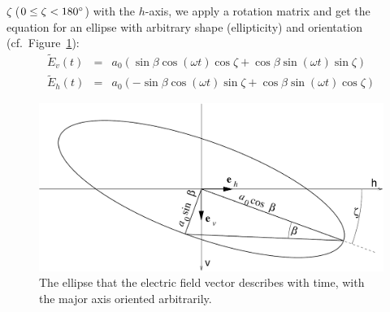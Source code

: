 $\zeta$ ($0 \leq \zeta < 180^\circ$) with the $h$-axis, we apply a
rotation matrix and get the equation for an ellipse with arbitrary
shape (ellipticity) and orientation (cf.\
Figure~\ref{fig:polarization:ellipse_arbitrary}):
\begin{eqnarray}
  \label{eq:polarization:ellipse_rotated1}
 \tilde{E}_v (t) &=&  a_0(  \sin\beta \cos(\omega t) \cos\zeta
                           +\cos\beta \sin(\omega t) \sin\zeta )\\
  \label{eq:polarization:ellipse_rotated2}
 \tilde{E}_h (t) &=&  a_0( -\sin\beta \cos(\omega t) \sin\zeta
                           +\cos\beta \sin(\omega t) \cos\zeta )
\end{eqnarray}
%
\begin{figure}[!h]
 \begin{center}
  \begin{minipage}[c]{0.9\textwidth}
   \begin{center}
    \includegraphics*[width=0.9\hsize]{Figs/pol_ellipse_arbitrary}
   \end{center}
  \end{minipage}
  \begin{minipage}[c]{0.9\textwidth}
   \caption{The ellipse that the electric field vector describes with
     time, with the major axis oriented arbitrarily.}
   \label{fig:polarization:ellipse_arbitrary}
  \end{minipage}
 \end{center}
\end{figure}   



